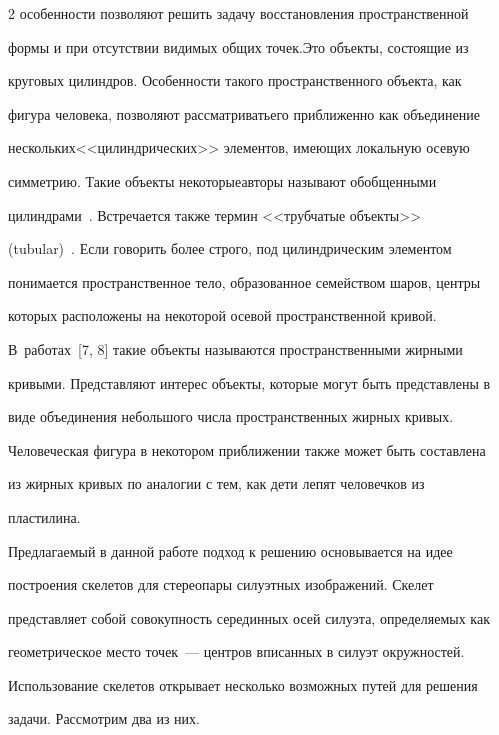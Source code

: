 \begin{multicols}{2}
особенности позволяют решить задачу восстановления пространственной 

формы и при отсутствии видимых общих точек.\linebreak Это объекты, состоящие из 

круговых цилиндров. Особенности такого пространственного объекта, как 

фигура человека, позволяют рассматривать\linebreak его приближенно как объединение 

нескольких\linebreak <<цилиндрических>> элементов, имеющих локальную осевую 

симметрию. Такие объекты некоторые\linebreak авторы называют обобщенными 

цилиндрами~\cite{2ts}. Встречается также термин <<трубчатые объекты>> 

(tubular)~\cite{3ts}. Если говорить более строго, под цилиндрическим элементом 

понимается пространственное тело, образованное семейством шаров, центры 

которых расположены на некоторой осевой пространственной кривой. 

В~работах~[7, 8] такие объекты называются пространственными жирными 

кривыми. Представляют интерес объекты, которые могут быть представлены в 

виде объединения небольшого числа пространственных жирных кривых. 

Человеческая фигура в некотором приближении также может быть составлена 

из жирных кривых по аналогии с тем, как дети лепят человечков из 

пластилина.

     

     Предлагаемый в данной работе подход к решению основывается на идее 

построения скелетов для стереопары силуэтных изображений. Скелет 

представляет собой совокупность серединных осей силуэта, определяемых как 

геометрическое место точек~--- центров вписанных в силуэт окружностей. 

Использование скелетов открывает несколько возможных путей для решения 

задачи. Рассмотрим два из них. 


\end{multicols}
